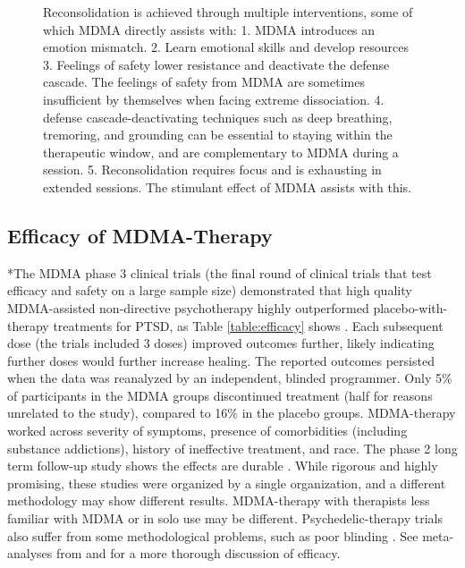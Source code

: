 \documentclass[12pt,letterpaper]{article}
\begin{document}
\begin{figure}[h!]
\begin{framed}
\end{framed}
\caption{Reconsolidation is achieved through multiple interventions, some of which MDMA directly assists with: 1. MDMA introduces an emotion mismatch. 2. Learn emotional skills and develop resources 3. Feelings of safety lower resistance and deactivate the defense cascade. The feelings of safety from MDMA are sometimes insufficient by themselves when facing extreme dissociation. 4. defense cascade-deactivating techniques such as deep breathing, tremoring, and grounding can be essential to staying within the therapeutic window, and are complementary to MDMA during a session. 5. Reconsolidation requires focus and is exhausting in extended sessions. The stimulant effect of MDMA assists with this.}
\label{fig:healing}
\end{figure}
\FloatBarrier
\subsection{Efficacy of MDMA-Therapy}
*The MDMA phase 3 clinical trials (the final round of clinical trials that test efficacy and safety on a large sample size) demonstrated that high quality MDMA-assisted non-directive psychotherapy highly outperformed placebo-with-therapy treatments for PTSD, as Table \ref{table:efficacy} shows \cite{mitchellMDMAClinicalTrial,mitchellMDMAClinicalTrial2}. Each subsequent dose (the trials included 3 doses) improved outcomes further, likely indicating further doses would further increase healing. The reported outcomes persisted when the data was reanalyzed by an independent, blinded programmer. Only 5\% of participants in the MDMA groups discontinued treatment (half for reasons unrelated to the study), compared to 16\% in the placebo groups. MDMA-therapy worked across severity of symptoms, presence of comorbidities (including substance addictions), history of ineffective treatment, and race. The phase 2 long term follow-up study shows the effects are durable \cite{jeromeMDMALongTerm}. While rigorous and highly promising, these studies were organized by a single organization, and a different methodology may show different results. MDMA-therapy with therapists less familiar with MDMA or in solo use may be different. Psychedelic-therapy trials also suffer from some methodological problems, such as poor blinding \cite{adayMethodologicalRigor}. See meta-analyses from \textcite{greenMeta} and \textcite{smithSystematic} for a more thorough discussion of efficacy.
\end{document}
